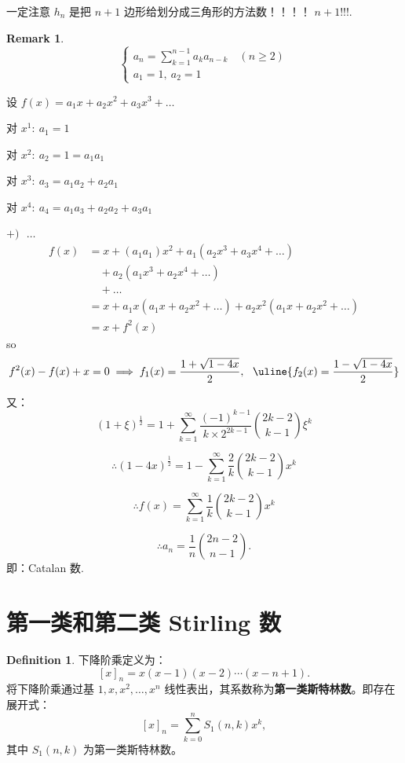 \documentclass[oneside]{book}
\theoremstyle{definition}
\newtheorem{definition}{Definition}[section]
\newtheorem{remark}{Remark}[section]
\begin{document}
一定注意 \(h_n\) 是把 \(n+1\) 边形给划分成三角形的方法数！！！！ \(n+1!!!\).
\begin{remark}
\[
\begin{cases}
	a_n = \sum_{k=1}^{n-1} a_k a_{n-k} \quad (n \geq 2) \\
	a_1 = 1,\ a_2 = 1
\end{cases}
\]

设 \( f(x) = a_1x + a_2x^2 + a_3x^3 + \dots \)

对 \( x^1: \ a_1 = 1 \)

对 \( x^2: \ a_2 = 1=a_1a_1 \)

对 \( x^3: \ a_3 = a_1a_2 + a_2a_1 \)

对 \( x^4: \ a_4 = a_1a_3 + a_2a_2 + a_3a_1 \)

\( +)\ \ \ \dots \)
\[
\begin{aligned}
	f(x) &= x + (a_1a_1){x^2} + a_1\left(a_2x^3 + a_3x^4 + \dots\right) \\
	&\quad + a_2\left(a_1x^3 + a_2x^4 + \dots\right) \\
	&\quad + \dots \\
	&= x + a_1x(a_1x + a_2x^2 + \dots) + a_2x^2(a_1x + a_2x^2 + \dots) \\
	&= x + f^2(x)
\end{aligned}
\]
so
\[ f^2(x) - f(x) + x = 0 \implies f_1(x) = \frac{1+\sqrt{1-4x}}{2},\ \ \uline{f_2(x) = \frac{1-\sqrt{1-4x}}{2}}\]

又：\[ (1+\xi)^{\frac{1}{2}} = 1 + \sum_{k=1}^\infty \frac{(-1)^{k-1}}{k \times 2^{2k-1}} \binom{2k-2}{k-1} \xi^k \]

\[\therefore (1-4x)^{\frac{1}{2}} = 1 - \sum_{k=1}^\infty \frac{2}{k} \binom{2k-2}{k-1} x^k\]

\[\therefore f(x) = \sum_{k=1}^\infty \frac{1}{k} \binom{2k-2}{k-1} x^k\]

\[\therefore a_n = \frac{1}{n} \binom{2n-2}{n-1}.\] 即：Catalan 数.
\end{remark}
\section{第一类和第二类 Stirling 数}

\begin{definition}
	下降阶乘定义为：
	\[ [x]_n = x(x - 1)(x - 2)\cdots(x - n + 1). \]
	将下降阶乘通过基 \( 1, x, x^2, \dots, x^n \) 线性表出，其系数称为\textbf{第一类斯特林数}。即存在展开式：
	\[ [x]_n = \sum_{k = 0}^n S_1(n, k) x^k, \]
	其中 \( S_1(n, k) \) 为第一类斯特林数。
\end{definition}
\end{document}
